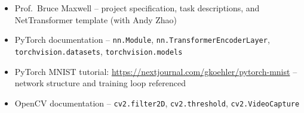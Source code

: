 \documentclass[11pt]{article}
\begin{document}
\begin{itemize}
    \item Prof.\ Bruce Maxwell -- project specification, task descriptions, and NetTransformer template (with Andy Zhao)
    \item PyTorch documentation -- \texttt{nn.Module}, \texttt{nn.TransformerEncoderLayer}, \texttt{torchvision.datasets}, \texttt{torchvision.models}
    \item PyTorch MNIST tutorial: \url{https://nextjournal.com/gkoehler/pytorch-mnist} -- network structure and training loop referenced
    \item OpenCV documentation -- \texttt{cv2.filter2D}, \texttt{cv2.threshold}, \texttt{cv2.VideoCapture}
\end{itemize}
\end{document}

